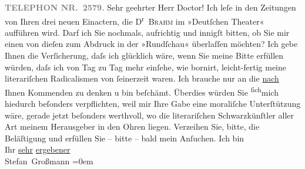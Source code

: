\begin{ledgroupsized}[t]{13cm}
           \pstart
           \textcolor{gray}{\textbf{TELEPHON NR. 2579.}}\pend
           \pstart\center{}Sehr geehrter Herr Doctor!\pend\pstart
           Ich leſe in den Zeitungen von \introOben{}Ihren\introOben{} drei neuen Einactern, die D\textsuperscript{r} \textsc{Brahm} im »Deutſchen Theater« aufführen wird.\pend
           \pstart
           Darf ich Sie nochmals, aufrichtig und innigſt bitten, ob Sie mir einen von dieſen zum
               Abdruck in der »Rundſchau« überlaſſen möchten?
               Ich gebe Ihnen die Verſicherung, daſs ich glücklich wäre, wenn Sie meine Bitte
               erfüllen würden, daſs ich von Tag zu Tag \strikeout{\textcolor{gray}{×}\-\textcolor{gray}{×}} mehr einſehe, wie bornirt, leicht-fertig meine  literariſchen Radicalismen von ſeinerzeit waren. Ich brauche nur an
               die \uline{nach} Ihnen Kommenden zu denken u bin
               beſchämt.\pend
           \pstart
           Überdies würden Sie \substVorne{}\textsuperscript{ſich}\substDazwischen{}mich\substHinten{} hiedurch beſonders verpflichten, weil mir Ihre Gabe eine moraliſche Unter{\pb}ſtützung wäre, gerade jetzt beſonders
               werthvoll, wo die literariſchen Schwarzkünſtler aller Art meinem Herausgeber in den Ohren
               liegen.\pend
           \pstart
           Verzeihen Sie, bitte, die Beläſtigung und erfüllen Sie – bitte – bald mein
               Anſuchen.\pend
           \pstart
           Ich bin{\\[\baselineskip]} Ihr \uline{sehr}{ }\uline{ergebener}{\\[\baselineskip]}\spacefill\mbox{Stefan Großmann}\pend
           \leftskip=0em{}
         
         \endnumbering{}\end{ledgroupsized}  \newcommand{\dateiname}{L00847}\newcommand{\titel}{Stefan Großmann an Arthur Schnitzler, 16. 9. 1898}\newcommand{\editorInnen}{ Martin Anton Müller und Gerd-Hermann Susen}
      